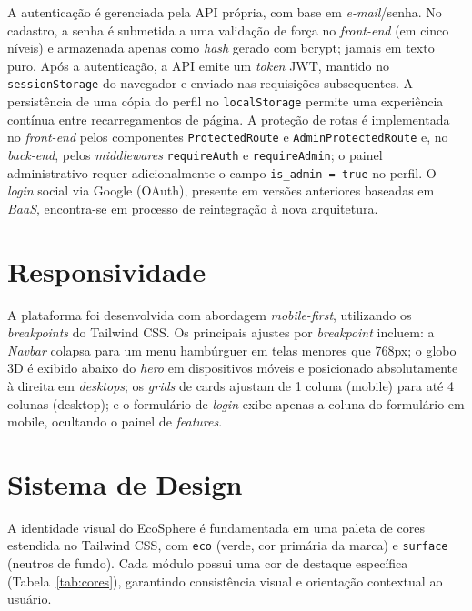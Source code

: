 \documentclass[
	12pt,
	openright,
	oneside,
	a4paper,
	chapter=TITLE,
	section=TITLE,
	subsection=TITLE,
	subsubsection=TITLE,
	english,
	brazil
	]{abntex2}
\begin{document}
A autenticação é gerenciada pela API própria, com base em \textit{e-mail}/senha. No cadastro, a senha é submetida a uma validação de força no \textit{front-end} (em cinco níveis) e armazenada apenas como \textit{hash} gerado com bcrypt; jamais em texto puro. Após a autenticação, a API emite um \textit{token} JWT, mantido no \texttt{sessionStorage} do navegador e enviado nas requisições subsequentes. A persistência de uma cópia do perfil no \texttt{localStorage} permite uma experiência contínua entre recarregamentos de página. A proteção de rotas é implementada no \textit{front-end} pelos componentes \texttt{ProtectedRoute} e \texttt{AdminProtectedRoute} e, no \textit{back-end}, pelos \textit{middlewares} \texttt{requireAuth} e \texttt{requireAdmin}; o painel administrativo requer adicionalmente o campo \texttt{is\_admin = true} no perfil. O \textit{login} social via Google (OAuth), presente em versões anteriores baseadas em \textit{BaaS}, encontra-se em processo de reintegração à nova arquitetura.

\section{Responsividade}

A plataforma foi desenvolvida com abordagem \textit{mobile-first}, utilizando os \textit{breakpoints} do Tailwind CSS. Os principais ajustes por \textit{breakpoint} incluem: a \textit{Navbar} colapsa para um menu hambúrguer em telas menores que 768px; o globo 3D é exibido abaixo do \textit{hero} em dispositivos móveis e posicionado absolutamente à direita em \textit{desktops}; os \textit{grids} de cards ajustam de 1 coluna (mobile) para até 4 colunas (desktop); e o formulário de \textit{login} exibe apenas a coluna do formulário em mobile, ocultando o painel de \textit{features}.

\section{Sistema de Design}

A identidade visual do EcoSphere é fundamentada em uma paleta de cores estendida no Tailwind CSS, com \texttt{eco} (verde, cor primária da marca) e \texttt{surface} (neutros de fundo). Cada módulo possui uma cor de destaque específica (Tabela~\ref{tab:cores}), garantindo consistência visual e orientação contextual ao usuário.
\end{document}
